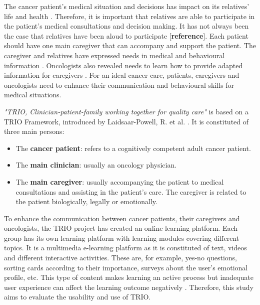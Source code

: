 \documentclass{sigchi}
\begin{document}
The cancer patient’s medical situation and decisions has impact on its relatives’ life and health \cite{Bevans2012}. Therefore, it is important that relatives are able to participate in the patient’s medical consultations and decision making. It has not always been the case that relatives have been aloud to participate [\textbf{reference}]. Each patient should have one main caregiver that can accompany and support the patient. The caregiver and relatives have expressed needs in medical and behavioural information \cite{Lamore2017}. Oncologists also revealed needs to learn how to provide adapted information for caregivers \cite{Stuij2018}. For an ideal cancer care, patients, caregivers and oncologists need to enhance their communication and behavioural skills for medical situations. 

\textit{"TRIO, Clinician-patient-family working together for quality care"} is based on a TRIO Framework, introduced by Laidsaar-Powell, R. et al. \cite{Laidsaar-Powell2017}. It is constituted of three main persons:

\begin{itemize}
    \item The \textbf{cancer patient}: refers to a cognitively competent adult cancer patient.
    \item The \textbf{main clinician}: usually an oncology physician.
    \item The \textbf{main caregiver}: usually accompanying the patient to medical consultations and assisting in the patient’s care. The caregiver is related to the patient biologically, legally or emotionally.
\end{itemize}

To enhance the communication between cancer patients, their caregivers and oncologists, the TRIO project has created an online learning platform. Each group has its own learning platform with learning modules covering different topics. It is a multimedia e-learning platform as it is constituted of text, videos and different interactive activities. These are, for example, yes-no questions, sorting cards according to their importance, surveys about the user’s emotional profile, etc. This type of content makes learning an active process but inadequate user experience can affect the learning outcome negatively \cite{Huang2005}. Therefore, this study aims to evaluate the usability and use of TRIO.
\end{document}
